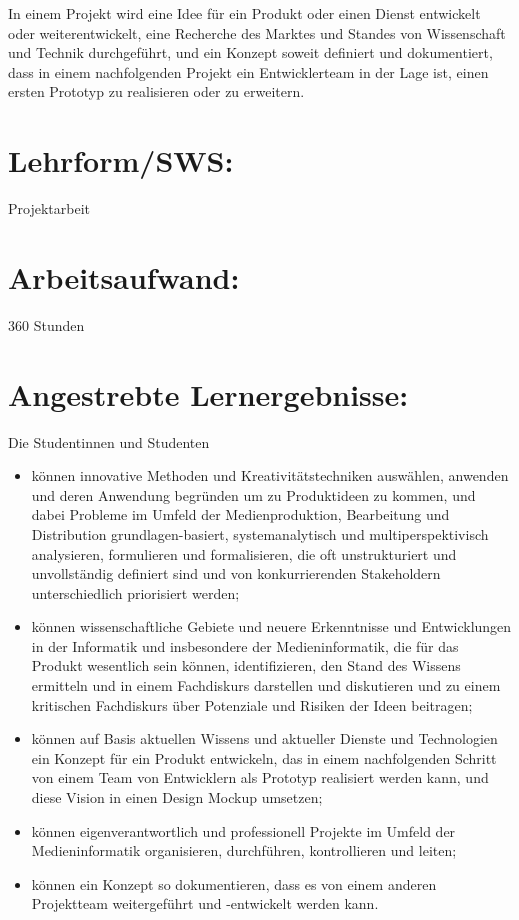 In einem Projekt wird eine Idee für ein Produkt oder einen Dienst
entwickelt oder weiterentwickelt, eine Recherche des Marktes und Standes
von Wissenschaft und Technik durchgeführt, und ein Konzept soweit
definiert und dokumentiert, dass in einem nachfolgenden Projekt ein
Entwicklerteam in der Lage ist, einen ersten Prototyp zu realisieren
oder zu erweitern.

\section*{Lehrform/SWS:}\label{lehrformsws-11}

Projektarbeit

\section*{Arbeitsaufwand:}\label{arbeitsaufwand-16}

360 Stunden

\section*{Angestrebte
Lernergebnisse:}\label{angestrebte-lernergebnisse-10}

Die Studentinnen und Studenten

\begin{itemize}
\tightlist
\item
  können innovative Methoden und Kreativitätstechniken auswählen,
  anwenden und deren Anwendung begründen um zu Produktideen zu kommen,
  und dabei Probleme im Umfeld der Medienproduktion, Bearbeitung und
  Distribution grundlagen-basiert, systemanalytisch und
  multiperspektivisch analysieren, formulieren und formalisieren, die
  oft unstrukturiert und unvollständig definiert sind und von
  konkurrierenden Stakeholdern unterschiedlich priorisiert werden;
\item
  können wissenschaftliche Gebiete und neuere Erkenntnisse und
  Entwicklungen in der Informatik und insbesondere der Medieninformatik,
  die für das Produkt wesentlich sein können, identifizieren, den Stand
  des Wissens ermitteln und in einem Fachdiskurs darstellen und
  diskutieren und zu einem kritischen Fachdiskurs über Potenziale und
  Risiken der Ideen beitragen;
\item
  können auf Basis aktuellen Wissens und aktueller Dienste und
  Technologien ein Konzept für ein Produkt entwickeln, das in einem
  nachfolgenden Schritt von einem Team von Entwicklern als Prototyp
  realisiert werden kann, und diese Vision in einen Design Mockup
  umsetzen;
\item
  können eigenverantwortlich und professionell Projekte im Umfeld der
  Medieninformatik organisieren, durchführen, kontrollieren und leiten;
\item
  können ein Konzept so dokumentieren, dass es von einem anderen
  Projektteam weitergeführt und -entwickelt werden kann.
\end{itemize}

